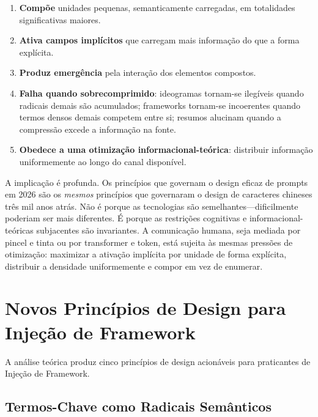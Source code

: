 \documentclass[12pt,a4paper]{article}
\begin{document}
\begin{enumerate}
  \item \textbf{Compõe} unidades pequenas, semanticamente carregadas, em totalidades significativas maiores.
  \item \textbf{Ativa campos implícitos} que carregam mais informação do que a forma explícita.
  \item \textbf{Produz emergência} pela interação dos elementos compostos.
  \item \textbf{Falha quando sobrecomprimido}: ideogramas tornam-se ilegíveis quando radicais demais são acumulados; frameworks tornam-se incoerentes quando termos densos demais competem entre si; resumos alucinam quando a compressão excede a informação na fonte.
  \item \textbf{Obedece a uma otimização informacional-teórica}: distribuir informação uniformemente ao longo do canal disponível.
\end{enumerate}

A implicação é profunda.
Os princípios que governam o design eficaz de prompts em 2026 são os \textit{mesmos} princípios que governaram o design de caracteres chineses três mil anos atrás.
Não é porque as tecnologias são semelhantes---dificilmente poderiam ser mais diferentes.
É porque as restrições cognitivas e informacional-teóricas subjacentes são invariantes.
A comunicação humana, seja mediada por pincel e tinta ou por transformer e token, está sujeita às mesmas pressões de otimização: maximizar a ativação implícita por unidade de forma explícita, distribuir a densidade uniformemente e compor em vez de enumerar.


\section{Novos Princípios de Design para Injeção de Framework}
\label{sec:design}

A análise teórica produz cinco princípios de design acionáveis para praticantes de Injeção de Framework.

\subsection{Termos-Chave como Radicais Semânticos}
\label{subsec:radicals-design}
\end{document}
